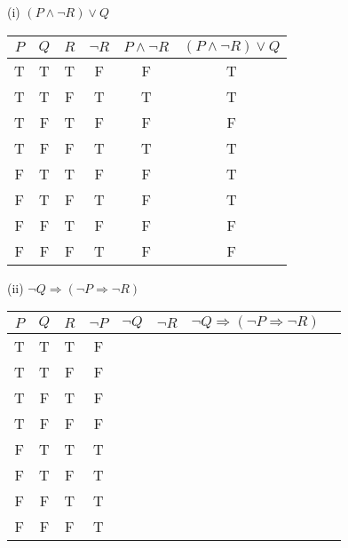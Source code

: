 \documentclass{article}
\begin{document}
(i) $(P \land \neg R) \lor Q$\\
\begin{tabular}{|c|c|c|c|c|c|}
    \hline
    $P$ & $Q$ & $R$ & $\neg R$ & $ P \land \neg R$ & $(P \land \neg R) \lor Q$ \\
    \hline
    T   & T   & T   & F        & F                 & T                         \\
    T   & T   & F   & T        & T                 & T                         \\
    T   & F   & T   & F        & F                 & F                         \\
    T   & F   & F   & T        & T                 & T                         \\
    F   & T   & T   & F        & F                 & T                         \\
    F   & T   & F   & T        & F                 & T                         \\
    F   & F   & T   & F        & F                 & F                         \\
    F   & F   & F   & T        & F                 & F                         \\
    \hline
\end{tabular}

(ii) $\neg Q \Rightarrow (\neg P \Rightarrow \neg R)$\\
\begin{tabular}{|c|c|c|c|c|c|c|c|}
    \hline
    $P$ & $Q$ & $R$ & $\neg P $ & $\neg Q$ & $\neg R$ & $\neg Q \Rightarrow (\neg P \Rightarrow \neg R)$ \\
    \hline
    T   & T   & T   &  F                                                                                  \\
    T   & T   & F   &  F                                                                                  \\
    T   & F   & T   &  F                                                                                  \\
    T   & F   & F   &   F                                                                                 \\
    F   & T   & T   &    T                                                                                \\
    F   & T   & F   &     T                                                                               \\
    F   & F   & T   &      T                                                                              \\
    F   & F   & F   &       T                                                                             \\
    \hline
\end{tabular}
\end{document}
